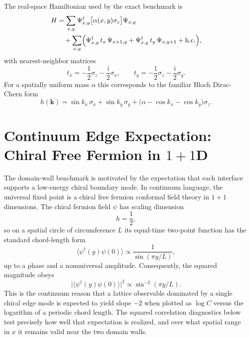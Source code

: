 \documentclass[aps,prb,onecolumn,nofootinbib]{revtex4-2}
\newcommand{\ii}{\mathrm{i}}
\begin{document}
The real-space Hamiltonian used by the exact benchmark is
\begin{align}
H
&=
\sum_{x,y}
\Psi_{x,y}^{\dagger}
\bigl[\alpha(x,y)\sigma_z \bigr]
\Psi_{x,y}
\nonumber\\
&\quad
+ \sum_{x,y}
\Bigl(
\Psi_{x,y}^{\dagger}\, t_x \,\Psi_{x+1,y}
+
\Psi_{x,y}^{\dagger}\, t_y \,\Psi_{x,y+1}
+
\mathrm{h.c.}
\Bigr),
\label{eq:realspace-h}
\end{align}
with nearest-neighbor matrices
\begin{equation}
t_x = -\frac{1}{2}\sigma_z - \frac{\ii}{2}\sigma_x,
\qquad
t_y = -\frac{1}{2}\sigma_z - \frac{\ii}{2}\sigma_y.
\label{eq:hopping-blocks}
\end{equation}
For a spatially uniform mass $\alpha$ this corresponds to the familiar Bloch
Dirac-Chern form
\begin{equation}
h(\bm{k})
=
\sin k_x\, \sigma_x
+
\sin k_y\, \sigma_y
+
\bigl(\alpha - \cos k_x - \cos k_y \bigr)\sigma_z.
\label{eq:bloch-h}
\end{equation}

\section{Continuum Edge Expectation: Chiral Free Fermion in \texorpdfstring{$1+1$}{1+1}D}
The domain-wall benchmark is motivated by the expectation that each interface
supports a low-energy chiral boundary mode.  In continuum language, the
universal fixed point is a chiral free fermion conformal field theory in
$1+1$ dimensions.  The chiral fermion field $\psi$ has scaling dimension
\begin{equation}
h = \frac{1}{2},
\end{equation}
so on a spatial circle of circumference $L$ its equal-time two-point function
has the standard chord-length form
\begin{equation}
\langle \psi^\dagger(y)\psi(0)\rangle
\propto
\frac{1}{\sin(\pi y/L)},
\label{eq:chiral-fermion-two-point}
\end{equation}
up to a phase and a nonuniversal amplitude.  Consequently, the squared
magnitude obeys
\begin{equation}
\bigl|\langle \psi^\dagger(y)\psi(0)\rangle\bigr|^2
\propto
\sin^{-2}(\pi y/L).
\label{eq:chiral-fermion-squared}
\end{equation}
This is the continuum reason that a lattice observable dominated by a single
chiral edge mode is expected to yield slope $-2$ when plotted as
$\log C$ versus the logarithm of a periodic chord length.  The squared
correlation diagnostics below test precisely how well that expectation is
realized, and over what spatial range in $x$ it remains valid near the two
domain walls.
\end{document}

